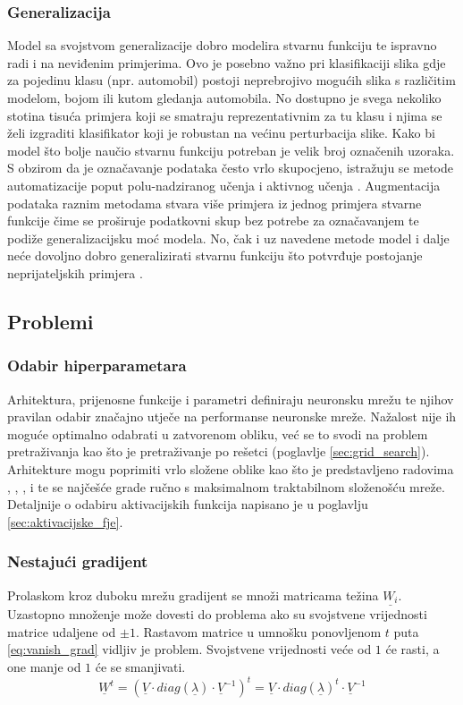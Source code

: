 \documentclass[times, utf8, numeric, diplomski]{fer}
\def\mat#1{\underline{#1}}
\def\secref#1{(poglavlje \ref{#1})}
\begin{document}
\subsubsection{Generalizacija}
\label{sec:generalizacija}
Model sa svojstvom generalizacije dobro modelira stvarnu funkciju te ispravno radi i na neviđenim primjerima. Ovo je posebno važno pri klasifikaciji slika gdje za pojedinu klasu (npr. automobil) postoji neprebrojivo mogućih slika s različitim modelom, bojom ili kutom gledanja automobila. No dostupno je svega nekoliko stotina tisuća primjera koji se smatraju reprezentativnim za tu klasu i njima se želi izgraditi klasifikator koji je robustan na većinu perturbacija slike. Kako bi model što bolje naučio stvarnu funkciju potreban je velik broj označenih uzoraka. S obzirom da je označavanje podataka često vrlo skupocjeno, istražuju se metode automatizacije poput polu-nadziranog učenja i aktivnog učenja \citep{active_learn}. Augmentacija podataka raznim metodama stvara više primjera iz jednog primjera stvarne funkcije čime se proširuje podatkovni skup bez potrebe za označavanjem te podiže generalizacijsku moć modela. No, čak i uz navedene metode model i dalje neće dovoljno dobro generalizirati stvarnu funkciju što potvrđuje postojanje neprijateljskih primjera \citep{intriguing_props}.

\subsection{Problemi}
\subsubsection{Odabir hiperparametara}
Arhitektura, prijenosne funkcije i parametri definiraju neuronsku mrežu te njihov pravilan odabir značajno utječe na performanse neuronske mreže. Nažalost nije ih moguće optimalno odabrati u zatvorenom obliku, već se to svodi na problem pretraživanja kao što je pretraživanje po rešetci \secref{sec:grid_search}. Arhitekture mogu poprimiti vrlo složene oblike kao što je predstavljeno radovima \citet{highwaynet}, \citet{resnet}, \citet{densenet}, \citet{inceptionnet} i \citet{yolo} te se najčešće grade ručno s maksimalnom traktabilnom složenošću mreže. Detaljnije o odabiru aktivacijskih funkcija napisano je u poglavlju \ref{sec:aktivacijske_fje}.

\subsubsection{Nestajući gradijent}
\label{sec:nestajući_grad}
Prolaskom kroz duboku mrežu gradijent se množi matricama težina $\mat{W_i}$. Uzastopno množenje može dovesti do problema ako su svojstvene vrijednosti matrice udaljene od $\pm 1$. Rastavom matrice u umnošku ponovljenom $t$ puta \eqref{eq:vanish_grad} vidljiv je problem. Svojstvene vrijednosti veće od $1$ će rasti, a one manje od $1$ će se smanjivati. \citep[poglavlje~8.2.5]{goodfellowbook}
\begin{equation}
\label{eq:vanish_grad}
\mat{W}^t = (\mat{V} \cdot diag(\mat{\lambda}) \cdot \mat{V}^{-1})^t = \mat{V} \cdot diag(\mat{\lambda})^t \cdot \mat{V}^{-1}
\end{equation}
\end{document}
